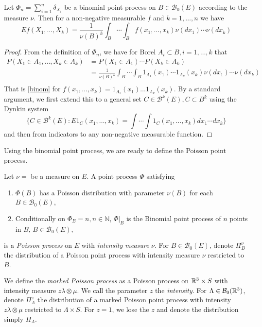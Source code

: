 \begin{proposition}\label{bincalc}
	Let $\Phi_n = \sum^{n}_{i=1}  \delta_{X_i}$ be a binomial point process on $B\in\mathcal B_0(E)$ according to the measure $\nu$. Then for a non-negative measurable $f$ and $k = 1,\dots, n$ we have
\begin{equation}\label{binom}
	Ef(X_1,\dots, X_k) = \frac 1{\nu(B)^k} \int_B \cdots \int_B f(x_1,\dots, x_k) \nu(dx_1) \cdots \nu(dx_k)
\end{equation}
\end{proposition}
\begin{proof}
From the definition of $\Phi_n$, we have for Borel $A_i \subset B, i=1,\dots,k$ that
\begin{align*}
P(X_1 \in A_1, \dots, X_k \in A_k) &= P(X_1\in A_1)\cdots P(X_k\in A_k) \\ 
& = \frac 1{\nu(B)^k} \int_B \cdots \int_B 1_{A_1}(x_1) \cdots 1_{A_k}(x_k) \nu(dx_1) \cdots \nu(dx_k) \\
\end{align*}
That is \ref{binom} for $f(x_1,\dots,x_k)=1_{A_1}(x_1)\dots 1_{A_k}(x_k)$. By a standard argument, we first extend this to a general set $C \in \mathcal B^k(E), C\subset B^k$ using the Dynkin system 
$$\{C \in \mathcal B^k(E): E 1_C (x_1,\dots,x_k) = \int \cdots \int 1_C(x_1,\dots, x_k) dx_1 \cdots dx_k \}$$
 and then from indicators to any non-negative measurable function.
\end{proof}



Using the binomial point process, we are ready to define the Poisson point process. 

\begin{definition} Let $\nu=$ be a measure on $E$. A point process $\Phi$ satisfying
\begin{enumerate}
	\item $\Phi(B)$ has a Poisson distribution with parameter $\nu(B)$ for each $B\in \mathcal B_0(E)$,
	\item Conditionally on $\Phi_B=n, n\in\mathbb N$,  $\Phi|_B$ is the Binomial point process of $n$ points in $B$, $B \in \mathcal B_0(E)$,
\end{enumerate}
is a \textit{Poisson process} on $E$ with \textit{intensity measure} $\nu$.
For $B\in \mathcal B_0(E)$, denote $\Pi^\nu_B$ the distribution of a Poisson point process with intensity measure $\nu$ restricted to $B$.  
\end{definition}

\begin{definition}We define the \textit{marked Poisson process} as a Poisson process on ${\mathbb R^3}\times S$ with intensity measure $z\lambda \otimes \mu$. We call the parameter $z$ the \textit{intensity}.\newline
	For $\Lambda\in \mathcal B_0({\mathbb R^3})$, denote $\Pi^z_\Lambda$ the distribution of a marked Poisson point process with intensity $z\lambda \otimes \mu$ restricted to $\Lambda\times S$. For $z=1$, we lose the $z$ and denote the distribution simply $\Pi_\Lambda$.
\end{definition}

